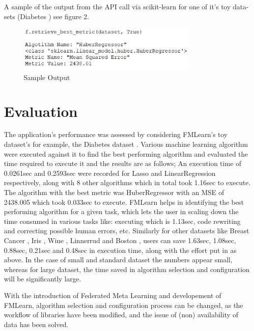 \documentclass{article}
\begin{document}
A sample of the output from the API call via scikit-learn for one of it's toy data-sets (Diabetes \cite{bradley-et-al}) see figure 2.
\begin{figure}[ht]
    \centering
    \includegraphics[width=3.5in]{sample-output.PNG}
    \caption{Sample Output}
    \label{sample-output}
\end{figure}


\section{Evaluation}
The application's performance was assessed by considering FMLearn's toy dataset's for example, the Diabetes dataset \cite{bradley-et-al}. Various machine learning algorithm were executed against it to find the best performing algorithm and evaluated the time required to execute it and the results are as follows; An execution time of 0.0261sec and 0.2593sec were recorded for Lasso and LinearRegression respectively, along with 8 other algorithms which in total took 1.16sec to execute. The algorithm with the best metric was HuberRegressor with an MSE of 2438.005 which took 0.033sec to execute. FMLearn helps in identifying the best performing algorithm for a given task, which lets the user in scaling down the time consumed in various tasks like: executing which is 1.13sec, code rewriting and correcting possible human errors, etc. Similarly for other datasets like Breast Cancer \cite{brendan-et-al}, Iris \cite{fisher:r}, Wine \cite{lichman:m}, Linnerrud \cite{tenenhaus:m} and Boston \cite{harrison-et-al}, users can save 1.63sec, 1.08sec, 0.88sec, 0.21sec and 0.48sec in execution time, along with the effort put in as above. In the case of small and standard dataset the numbers appear small, whereas for large dataset, the time saved in algorithm selection and configuration will be significantly large.

With the introduction of Federated Meta Learning and developement of FMLearn, algorithm selection and configuration process can be changed, as the workflow of libraries have been modified, and the issue of (non) availability of data has been solved.
\end{document}
